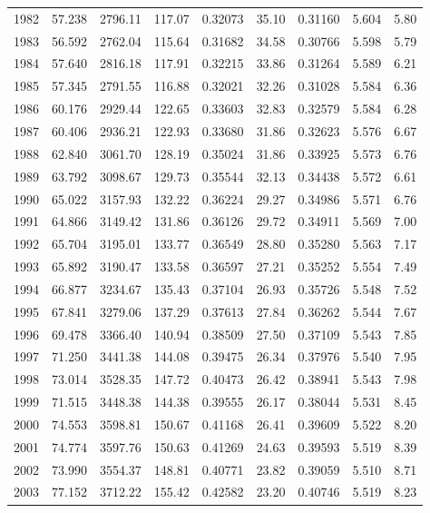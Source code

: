 \documentclass[reprint,aps,pra,longbibliography,floatfix]{revtex4-2}
\begin{document}
\begin{minipage}{\textwidth}
\begin{ruledtabular}
\begin{tabular}{rrrrrrrrr}
1982 & 57.238 & 2796.11 & 117.07 & 0.32073 & 35.10 & 0.31160 & 5.604 & 5.80 \\
1983 & 56.592 & 2762.04 & 115.64 & 0.31682 & 34.58 & 0.30766 & 5.598 & 5.79 \\
1984 & 57.640 & 2816.18 & 117.91 & 0.32215 & 33.86 & 0.31264 & 5.589 & 6.21 \\
1985 & 57.345 & 2791.55 & 116.88 & 0.32021 & 32.26 & 0.31028 & 5.584 & 6.36 \\
1986 & 60.176 & 2929.44 & 122.65 & 0.33603 & 32.83 & 0.32579 & 5.584 & 6.28 \\
1987 & 60.406 & 2936.21 & 122.93 & 0.33680 & 31.86 & 0.32623 & 5.576 & 6.67 \\
1988 & 62.840 & 3061.70 & 128.19 & 0.35024 & 31.86 & 0.33925 & 5.573 & 6.76 \\
1989 & 63.792 & 3098.67 & 129.73 & 0.35544 & 32.13 & 0.34438 & 5.572 & 6.61 \\
1990 & 65.022 & 3157.93 & 132.22 & 0.36224 & 29.27 & 0.34986 & 5.571 & 6.76 \\
1991 & 64.866 & 3149.42 & 131.86 & 0.36126 & 29.72 & 0.34911 & 5.569 & 7.00 \\
1992 & 65.704 & 3195.01 & 133.77 & 0.36549 & 28.80 & 0.35280 & 5.563 & 7.17 \\
1993 & 65.892 & 3190.47 & 133.58 & 0.36597 & 27.21 & 0.35252 & 5.554 & 7.49 \\
1994 & 66.877 & 3234.67 & 135.43 & 0.37104 & 26.93 & 0.35726 & 5.548 & 7.52 \\
1995 & 67.841 & 3279.06 & 137.29 & 0.37613 & 27.84 & 0.36262 & 5.544 & 7.67 \\
1996 & 69.478 & 3366.40 & 140.94 & 0.38509 & 27.50 & 0.37109 & 5.543 & 7.85 \\
1997 & 71.250 & 3441.38 & 144.08 & 0.39475 & 26.34 & 0.37976 & 5.540 & 7.95 \\
1998 & 73.014 & 3528.35 & 147.72 & 0.40473 & 26.42 & 0.38941 & 5.543 & 7.98 \\
1999 & 71.515 & 3448.38 & 144.38 & 0.39555 & 26.17 & 0.38044 & 5.531 & 8.45 \\
2000 & 74.553 & 3598.81 & 150.67 & 0.41168 & 26.41 & 0.39609 & 5.522 & 8.20 \\
2001 & 74.774 & 3597.76 & 150.63 & 0.41269 & 24.63 & 0.39593 & 5.519 & 8.39 \\
2002 & 73.990 & 3554.37 & 148.81 & 0.40771 & 23.82 & 0.39059 & 5.510 & 8.71 \\
2003 & 77.152 & 3712.22 & 155.42 & 0.42582 & 23.20 & 0.40746 & 5.519 & 8.23 \\

\end{tabular}
\end{ruledtabular}
\end{minipage}
\end{document}

